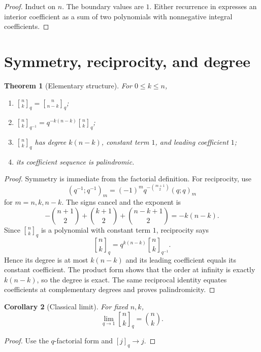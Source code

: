 \documentclass[11pt,oneside,openany]{book}
\newtheorem{theorem}{Theorem}[chapter]
\newtheorem{corollary}[theorem]{Corollary}
\theoremstyle{definition}
\theoremstyle{remark}
\newcommand{\qbinom}[2]{\genfrac{[}{]}{0pt}{}{#1}{#2}_{q}}
\newcommand{\Qbinom}[3]{\genfrac{[}{]}{0pt}{}{#1}{#2}_{#3}}
\begin{document}
\begin{proof}
Induct on $n$.  The boundary values are $1$.  Either recurrence in  expresses an interior coefficient as a sum of two polynomials with nonnegative integral coefficients.
\end{proof}

\section{Symmetry, reciprocity, and degree}

\begin{theorem}[Elementary structure]\label{thm:qbinom-structure}
For $0\le k\le n$,
\begin{enumerate}[label=\textup{(\roman*)}]
\item $\qbinom nk=\qbinom n{n-k}$;
\item $\displaystyle \Qbinom nk{q^{-1}}=q^{-k(n-k)}\qbinom nk$;
\item $\qbinom nk$ has degree $k(n-k)$, constant term $1$, and leading coefficient $1$;
\item its coefficient sequence is palindromic.
\end{enumerate}
\end{theorem}

\begin{proof}
Symmetry is immediate from the factorial definition.  For reciprocity, use
\[
 (q^{-1};q^{-1})_m=(-1)^mq^{-\binom{m+1}{2}}(q;q)_m
\]
for $m=n,k,n-k$.  The signs cancel and the exponent is
\[
 -\binom{n+1}{2}+\binom{k+1}{2}+\binom{n-k+1}{2}=-k(n-k).
\]
Since $\qbinom nk$ is a polynomial with constant term $1$, reciprocity says
\[
 \qbinom nk=q^{k(n-k)}\Qbinom nk{q^{-1}}.
\]
Hence its degree is at most $k(n-k)$ and its leading coefficient equals its constant coefficient.  The product form shows that the order at infinity is exactly $k(n-k)$, so the degree is exact.  The same reciprocal identity equates coefficients at complementary degrees and proves palindromicity.
\end{proof}

\begin{corollary}[Classical limit]\label{cor:qbinom-classical}
For fixed $n,k$,
\[
 \lim_{q\to1}\qbinom nk=\binom nk.
\]
\end{corollary}

\begin{proof}
Use the $q$-factorial form and $[j]_q\to j$.
\end{proof}
\end{document}
